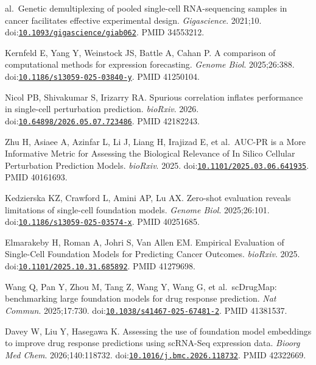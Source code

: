 \documentclass[11pt]{article}
\begin{document}
\begin{enumerate}[label={[\arabic*]},leftmargin=2.6em,labelsep=0.5em,itemsep=1.5pt]
  al.~Genetic demultiplexing of pooled single-cell RNA-sequencing
  samples in cancer facilitates effective experimental design.
  \emph{Gigascience}. 2021;10.
  doi:\href{https://doi.org/10.1093/gigascience/giab062}{\nolinkurl{10.1093/gigascience/giab062}}.
  PMID 34553212.
\item
  Kernfeld E, Yang Y, Weinstock JS, Battle A, Cahan P. A comparison of
  computational methods for expression forecasting. \emph{Genome Biol}.
  2025;26:388.
  doi:\href{https://doi.org/10.1186/s13059-025-03840-y}{\nolinkurl{10.1186/s13059-025-03840-y}}.
  PMID 41250104.
\item
  Nicol PB, Shivakumar S, Irizarry RA. Spurious correlation inflates
  performance in single-cell perturbation prediction. \emph{bioRxiv}.
  2026.
  doi:\href{https://doi.org/10.64898/2026.05.07.723486}{\nolinkurl{10.64898/2026.05.07.723486}}.
  PMID 42182243.
\item
  Zhu H, Asiaee A, Azinfar L, Li J, Liang H, Irajizad E, et al.~AUC-PR
  is a More Informative Metric for Assessing the Biological Relevance of
  In Silico Cellular Perturbation Prediction Models. \emph{bioRxiv}.
  2025.
  doi:\href{https://doi.org/10.1101/2025.03.06.641935}{\nolinkurl{10.1101/2025.03.06.641935}}.
  PMID 40161693.
\item
  Kedzierska KZ, Crawford L, Amini AP, Lu AX. Zero-shot evaluation
  reveals limitations of single-cell foundation models. \emph{Genome
  Biol}. 2025;26:101.
  doi:\href{https://doi.org/10.1186/s13059-025-03574-x}{\nolinkurl{10.1186/s13059-025-03574-x}}.
  PMID 40251685.
\item
  Elmarakeby H, Roman A, Johri S, Van Allen EM. Empirical Evaluation of
  Single-Cell Foundation Models for Predicting Cancer Outcomes.
  \emph{bioRxiv}. 2025.
  doi:\href{https://doi.org/10.1101/2025.10.31.685892}{\nolinkurl{10.1101/2025.10.31.685892}}.
  PMID 41279698.
\item
  Wang Q, Pan Y, Zhou M, Tang Z, Wang Y, Wang G, et al.~scDrugMap:
  benchmarking large foundation models for drug response prediction.
  \emph{Nat Commun}. 2025;17:730.
  doi:\href{https://doi.org/10.1038/s41467-025-67481-2}{\nolinkurl{10.1038/s41467-025-67481-2}}.
  PMID 41381537.
\item
  Davey W, Liu Y, Hasegawa K. Assessing the use of foundation model
  embeddings to improve drug response predictions using scRNA-Seq
  expression data. \emph{Bioorg Med Chem}. 2026;140:118732.
  doi:\href{https://doi.org/10.1016/j.bmc.2026.118732}{\nolinkurl{10.1016/j.bmc.2026.118732}}.
  PMID 42322669.
\item

\end{enumerate}
\end{document}
